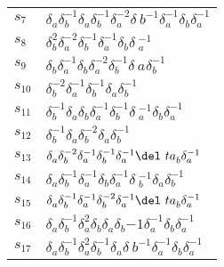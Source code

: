 \documentclass{article}
\begin{document}
\begin{center}
\begin{tabular}{ll}
$s_{7}$ & $\delta_a^{}\delta_b^{-1}\delta_a^{}\delta_b^{-1}\delta_a^{-2}\delta_\
b^{-1}\delta_a^{-1}\delta_b^{}\delta_a^{-1}$ \\
$s_{8}$ & $\delta_b^{2}\delta_a^{-2}\delta_b^{-1}\delta_a^{-1}\delta_b^{}\delta\
_a^{-1}$ \\
$s_{9}$ & $\delta_b^{}\delta_a^{-1}\delta_b^{}\delta_a^{-2}\delta_b^{-1}\delta_\
a^{}\delta_b^{-1}$ \\
$s_{10}$ & $\delta_b^{-2}\delta_a^{-1}\delta_b^{-1}\delta_a^{}\delta_b^{-1}$ \\
$s_{11}$ & $\delta_b^{-1}\delta_a^{}\delta_b^{}\delta_a^{-1}\delta_b^{-1}\delta\
_a^{-1}\delta_b^{}\delta_a^{-1}$ \\
$s_{12}$ & $\delta_b^{-1}\delta_a^{}\delta_b^{-2}\delta_a^{}\delta_b^{-1}$ \\
$s_{13}$ & $\delta_a^{}\delta_b^{-2}\delta_a^{-1}\delta_b^{-1}\delta_a^{-1}\del\
ta_b^{}\delta_a^{-1}$ \\
$s_{14}$ & $\delta_a^{}\delta_b^{-1}\delta_a^{-1}\delta_b^{}\delta_a^{-1}\delta\
_b^{-1}\delta_a^{}\delta_b^{-1}$ \\
$s_{15}$ & $\delta_a^{}\delta_b^{-1}\delta_a^{-1}\delta_b^{-2}\delta_a^{-1}\del\
ta_b^{}\delta_a^{-1}$ \\
$s_{16}$ & $\delta_a^{}\delta_b^{-1}\delta_a^{2}\delta_b^{}\delta_a^{}\delta_b^\
{-1}\delta_a^{-1}\delta_b^{}\delta_a^{-1}$ \\
$s_{17}$ & $\delta_a^{}\delta_b^{-1}\delta_a^{2}\delta_b^{-1}\delta_a^{}\delta_\
b^{-1}\delta_a^{-1}\delta_b^{}\delta_a^{-1}$ \\
\bottomrule
\end{tabular}
\end{center}

\thispagestyle{empty}
\end{document}
